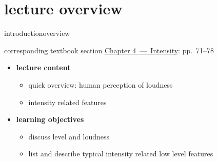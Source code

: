 




\subtitle{Module 4.1: Intensity}


	

    \section[overview]{lecture overview}
        \begin{frame}{introduction}{overview}
            \begin{block}{corresponding textbook section}
                    \href{http://ieeexplore.ieee.org/xpl/articleDetails.jsp?arnumber=6331121}{Chapter 4~---~Intensity}: pp.~71--78
            \end{block}

            \begin{itemize}
                \item   \textbf{lecture content}
                    \begin{itemize}
                        \item   quick overview: human perception of loudness 
                        \item   intensity related features
                    \end{itemize}
                \bigskip
                \item<2->   \textbf{learning objectives}
                    \begin{itemize}
                        \item   discuss level and loudness
                        \item   list and describe typical intensity related low level features
                    \end{itemize}
            \end{itemize}
        \end{frame}

